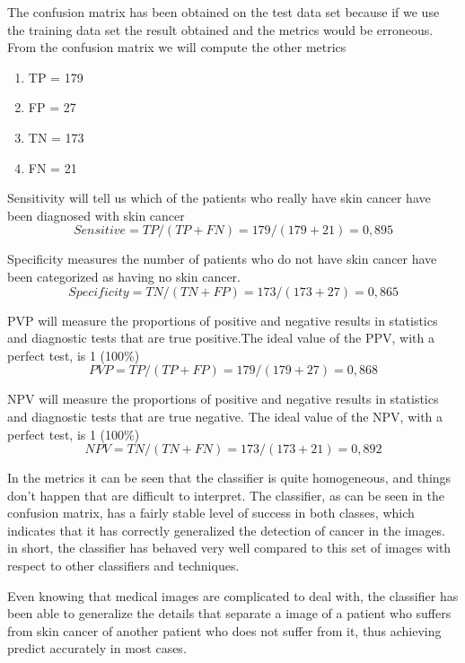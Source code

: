 The confusion matrix has been obtained on the test data set because if we use the training data set the result obtained and the metrics would be erroneous. From the confusion matrix we will compute the other metrics

\begin{enumerate}
\item TP = 179
\item FP = 27
\item TN = 173
\item FN = 21
\end{enumerate}

Sensitivity will tell us which of the patients who really have skin cancer have been diagnosed with skin cancer
\[ Sensitive = TP/(TP+FN) = 179 / (179+21) = 0,895 \]

Specificity measures the number of patients who do not have skin cancer have been categorized as having no skin cancer.
\[ Specificity  = TN/(TN+FP) = 173 / (173+27) = 0,865 \]

PVP will measure the proportions of positive and negative results in statistics and diagnostic tests that are true positive.The ideal value of the PPV, with a perfect test, is 1 (100\%)
\[ PVP = TP/(TP+FP) = 179 / (179+27) = 0,868 \]

NPV will measure the proportions of positive and negative results in statistics and diagnostic tests that are true negative. The ideal value of the NPV, with a perfect test, is 1 (100\%)
\[ NPV = TN/(TN+FN) = 173 / (173+21) = 0,892 \]

In the metrics it can be seen that the classifier is quite homogeneous, and things don't happen that are difficult to interpret. The classifier, as can be seen in the confusion matrix, has a fairly stable level of success in both classes, which indicates that it has correctly generalized the detection of cancer in the images. in short, the classifier has behaved very well compared to this set of images with respect to other classifiers and techniques. 

Even knowing that medical images are complicated to deal with, the classifier has been able to generalize the details that separate a image of a patient who suffers from skin cancer of another patient who does not suffer from it, thus achieving predict accurately in most cases.
